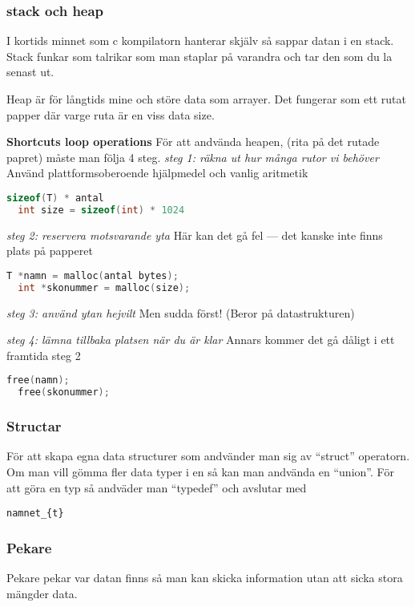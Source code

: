 \begin{multicols}{2}
\subsubsection{stack och heap}
I kortids minnet som c kompilatorn hanterar skjälv så sappar datan i en stack.
Stack funkar som talrikar som man staplar på varandra och tar den som du la senast ut.

Heap är för långtids mine och störe data som arrayer.
Det fungerar som ett rutat papper där varge ruta är en viss data size.

\noindent\textbf{Shortcuts loop operations}
För att andvända heapen, (rita på det rutade papret) måste man följa 4 steg.
\noindent\emph{ steg 1: räkna ut hur många rutor vi behöver} \newline
Använd plattformsoberoende hjälpmedel och vanlig aritmetik
\begin{lstlisting}[language=C]
  sizeof(T) * antal
  int size = sizeof(int) * 1024
\end{lstlisting}

\noindent\emph{ steg 2: reservera motsvarande yta} \newline
Här kan det gå fel — det kanske inte finns plats på papperet
\begin{lstlisting}[language=C]
  T *namn = malloc(antal bytes); 
  int *skonummer = malloc(size);
\end{lstlisting}

\noindent\emph{ steg 3: använd ytan hejvilt} \newline
Men sudda först!
(Beror på datastrukturen)

\noindent\emph{ steg 4: lämna tillbaka platsen när du är klar} \newline
Annars kommer det gå dåligt i ett framtida steg 2
\begin{lstlisting}[language=C]
  free(namn); 
  free(skonummer);
\end{lstlisting}


\subsubsection{Structar}
För att skapa egna data structurer som andvänder man sig av ``struct'' operatorn.
Om man vill gömma fler data typer i en så kan man andvända en ``union''.
För att göra en typ så andväder man ``typedef'' och avslutar med \begin{verbatim}namnet_{t}\end{verbatim}

\subsubsection{Pekare}
Pekare pekar var datan finns så man kan skicka information utan att sicka stora mängder data.


\end{multicols}

